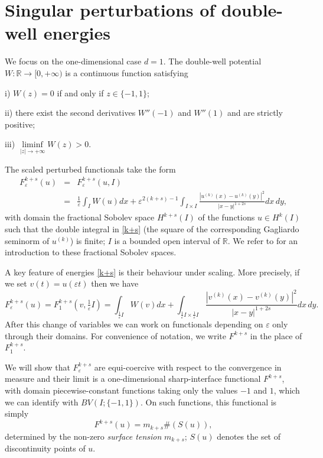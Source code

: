 \documentclass{article}
\newcommand{\e}{\varepsilon}
\begin{document}
\section{Singular perturbations of double-well energies}
We focus on the one-dimensional case $d=1$.
The double-well potential $W\colon\mathbb R\to [0,+\infty)$ is a continuous function satisfying

\smallskip i) $W(z)=0$ if and only if $z\in\{-1,1\}$;

\smallskip ii) there exist the second derivatives $W''(-1)$ and $W''(1)$ and are strictly positive;

\smallskip iii) $\liminf\limits_{|z|\to+\infty} W(z)>0$.

\smallskip The scaled perturbed functionals take the form 
 \begin{eqnarray}\label{k+s}\nonumber
F^{k+s}_\e(u)&=&F^{k+s}_\e(u, I)\\
&=&\frac1\e\int_I W(u)dx+ \e^{2(k+s)-1} \int_{I\times I}\frac{|u^{(k)}(x)-u^{(k)}(y)|^2}{|x-y|^{1+2s}}dx\,dy,
\end{eqnarray}
with domain the fractional Sobolev space $H^{k+s}(I)$ of the functions $u\in H^k(I)$ such that the double integral in \eqref{k+s} (the square of the corresponding Gagliardo seminorm of $u^{(k)}$) is finite; $I$ is a bounded open interval of $\mathbb R$. We refer to \cite{leofrac} for an introduction to these fractional Sobolev spaces.

A key feature of energies \eqref{k+s} is their behaviour under scaling. More precisely, if we set $v(t)=u(\e t)$ then we have
 \begin{equation}\label{k+s-risc}
F^{k+s}_\e(u)=F^{k+s}_1(v, \tfrac1\e I)=\int_{\frac1\e I} W(v)dx+ \int_{\frac1\e I\times \frac1\e I}\frac{|v^{(k)}(x)-v^{(k)}(y)|^2}{|x-y|^{1+2s}}dx\,dy.
\end{equation}
After this change of variables we can work on functionals depending on $\e$ only through their domains. For convenience of notation, we write $F^{k+s}$ in the place of $F^{k+s}_1$.

We will show that $F^{k+s}_\e$ are equi-coercive with respect to the convergence in measure and their limit is a one-dimensional sharp-interface functional $F^{k+s}$, with domain piecewise-constant functions taking only the values $-1$ and $1$, which we can identify with $BV(I;\{-1,1\})$. On such functions, this functional is simply
 \begin{equation}\label{k+s-lim}
F^{k+s}(u)= m_{k+s} \#(S(u)),
\end{equation}
determined by the non-zero {\em surface tension} $m_{k+s}$; $S(u)$ denotes the set of discontinuity points of $u$.
\end{document}
